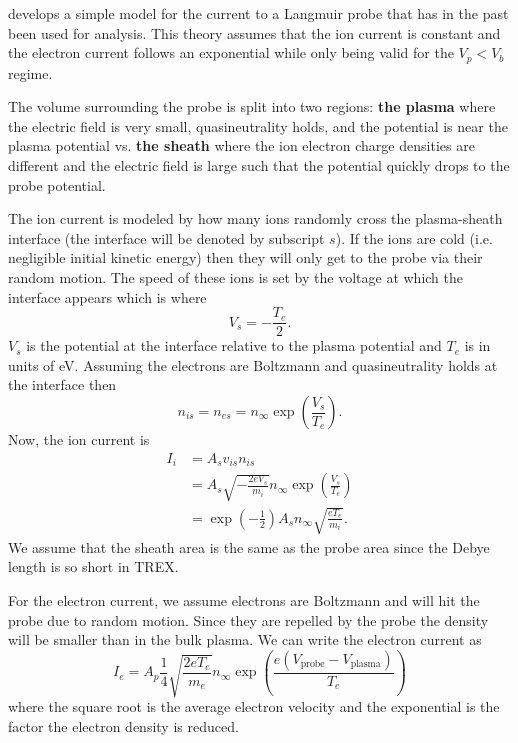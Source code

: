 \cite{Hutchinson_2002} develops a simple model for the current to a Langmuir probe that has in the past been used for analysis. This theory assumes that the ion current is constant and the electron current follows an exponential while only being valid for the $V_p < V_b$ regime.



The volume surrounding the probe is split into two regions: \textbf{the plasma} where the electric field is very small, quasineutrality holds, and the potential is near the plasma potential vs. \textbf{the sheath} where the ion electron charge densities are different and the electric field is large such that the potential quickly drops to the probe potential.

The ion current is modeled by how many ions randomly cross the plasma-sheath interface (the interface will be denoted by subscript $s$). If the ions are cold (i.e. negligible initial kinetic energy) then they will only get to the probe via their random motion. The speed of these ions is set by the voltage at which the interface appears which is where
\begin{equation}
    V_s = -\frac{T_e}{2}.
\end{equation}
$V_s$ is the potential at the interface relative to the plasma potential and $T_e$ is in units of eV. Assuming the electrons are Boltzmann and quasineutrality holds at the interface then
\begin{equation}
    n_{is} = n_{es} = n_\infty \exp\left(\frac{V_s}{T_e}\right).
\end{equation}
Now, the ion current is
\begin{align}
    I_i &= A_s v_{is} n_{is} \\
    &= A_s \sqrt{-\frac{2eV_s}{m_i}} n_\infty \exp\left(\frac{V_s}{T_e}\right) \\
    &= \exp\left(-\frac{1}{2}\right) A_s n_\infty \sqrt{\frac{e T_e}{m_i}}.
\end{align}
We assume that the sheath area is the same as the probe area since the Debye length is so short in TREX.

For the electron current, we assume electrons are Boltzmann and will hit the probe due to random motion. Since they are repelled by the probe the density will be smaller than in the bulk plasma. We can write the electron current as
\begin{equation}
    I_e = A_p \frac{1}{4} \sqrt{\frac{2 e T_e}{m_e}} n_\infty \exp\left(\frac{e (V_\text{probe} - V_\text{plasma})}{T_e}\right)
\end{equation}
where the square root is the average electron velocity and the exponential is the factor the electron density is reduced.

